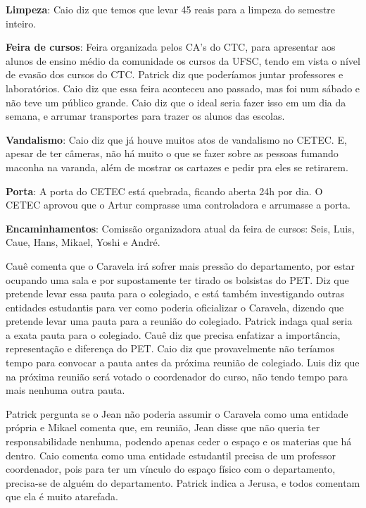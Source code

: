 \documentclass{ata-calico}
\begin{document}
\maketitle
{}

\textbf{Limpeza}: Caio diz que temos que levar 45 reais para a limpeza do semestre inteiro.

\textbf{Feira de cursos}: Feira organizada pelos CA's do CTC, para apresentar aos alunos de ensino médio da comunidade os cursos da UFSC, tendo em vista o nível de evasão dos cursos do CTC. Patrick diz que poderíamos juntar professores e laboratórios. Caio diz que essa feira aconteceu ano passado, mas foi num sábado e não teve um público grande. Caio diz que o ideal seria fazer isso em um dia da semana, e arrumar transportes para trazer os alunos das escolas.

\textbf{Vandalismo}: Caio diz que já houve muitos atos de vandalismo no CETEC. E, apesar de ter câmeras, não há muito o que se fazer sobre as pessoas fumando maconha na varanda, além de mostrar os cartazes e pedir pra eles se retirarem.

\textbf{Porta}: A porta do CETEC está quebrada, ficando aberta 24h por dia. O CETEC aprovou que o Artur comprasse uma controladora e arrumasse a porta.\newline

\textbf{Encaminhamentos}: Comissão organizadora atual da feira de cursos: Seis, Luis, Caue, Hans, Mikael, Yoshi e André.


Cauê comenta que o Caravela irá sofrer mais pressão do departamento, por estar ocupando uma sala e por supostamente ter tirado os bolsistas do PET. Diz que pretende levar essa pauta para o colegiado, e está também investigando outras entidades estudantis para ver como poderia oficializar o Caravela, dizendo que pretende levar uma pauta para a reunião do colegiado. Patrick indaga qual seria a exata pauta para o colegiado. Cauê diz que precisa enfatizar a importância, representação e diferença do PET. Caio diz que provavelmente não teríamos tempo para convocar a pauta antes da próxima reunião de colegiado. Luis diz que na próxima reunião será votado o coordenador do curso, não tendo tempo para mais nenhuma outra pauta.

Patrick pergunta se o Jean não poderia assumir o Caravela como uma entidade própria e Mikael comenta que, em reunião, Jean disse que não queria ter responsabilidade nenhuma, podendo apenas ceder o espaço e os materias que há dentro. Caio comenta como uma entidade estudantil precisa de um professor coordenador, pois para ter um vínculo do espaço físico com o departamento, precisa-se de alguém do departamento. Patrick indica a Jerusa, e todos comentam que ela é muito atarefada. 
\end{document}
